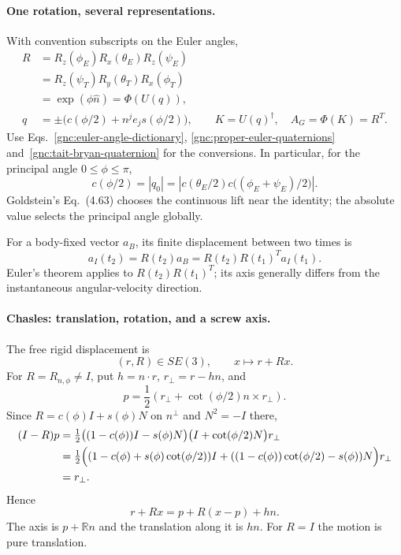 \paragraph{One rotation, several representations.}
With convention subscripts on the Euler angles,
\begin{equation}\label{gnc:rotation-representation-dictionary}
 \begin{aligned}
 R&=R_z(\phi_E)R_x(\theta_E)R_z(\psi_E)\\
  &=R_z(\psi_T)R_y(\theta_T)R_x(\phi_T)\\
  &=\exp(\phi\widehat n)=\Phi(U(q)),\\
 q&=\pm\bigl(c(\phi/2)+n^je_j s(\phi/2)\bigr),\qquad
 K=U(q)^\dagger,\quad A_G=\Phi(K)=R^T.
 \end{aligned}
\end{equation}
Use Eqs.~\eqref{gnc:euler-angle-dictionary},
\eqref{gnc:proper-euler-quaternions} and~\eqref{gnc:tait-bryan-quaternion}
for the conversions. In particular, for the principal angle $0\le\phi\le\pi$,
\begin{equation}\label{gnc:goldstein-half-angle}
 c(\phi/2)=|q_0|
 =\left|c(\theta_E/2)c\bigl((\phi_E+\psi_E)/2\bigr)\right|.
\end{equation}
Goldstein's Eq.~(4.63) chooses the continuous lift near the identity;
the absolute value selects the principal angle globally.

For a body-fixed vector $a_B$, its finite displacement between two times is
\[
 a_I(t_2)=R(t_2)a_B=R(t_2)R(t_1)^Ta_I(t_1).
\]
Euler's theorem applies to $R(t_2)R(t_1)^T$; its axis generally differs
from the instantaneous angular-velocity direction.

\paragraph{Chasles: translation, rotation, and a screw axis.}
The free rigid displacement is
\[
 (r,R)\in SE(3),\qquad x\longmapsto r+Rx.
\]
For $R=R_{n,\phi}\ne I$, put $h=n\cdot r$, $r_\perp=r-hn$, and
\[
 p=\frac12\left(r_\perp+\cot(\phi/2)n\times r_\perp\right).
\]
Since $R=c(\phi)I+s(\phi)N$ on $n^\perp$ and $N^2=-I$ there,
\begin{align*}
 (I-R)p
 &=\tfrac12\bigl((1-c(\phi))I-s(\phi)N\bigr)
       \bigl(I+\cot(\phi/2)N\bigr)r_\perp\\
 &=\tfrac12\Bigl((1-c(\phi)+s(\phi)\cot(\phi/2))I
       +((1-c(\phi))\cot(\phi/2)-s(\phi))N\Bigr)r_\perp\\
 &=r_\perp.
\end{align*}
Hence
\[
 r+Rx=p+R(x-p)+hn.
\]
The axis is $p+\mathbb R n$ and the translation along it is $hn$.
For $R=I$ the motion is pure translation.
